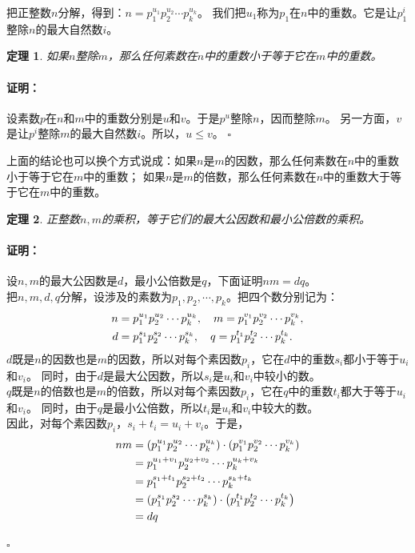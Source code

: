 \documentclass[12pt,UTF8]{ctexbook}
\newtheorem{tm}{定理}[section]
\newenvironment{proof2}{\paragraph{\textbf{证明：}}}{\hfill$\square$}
\begin{document}
把正整数$n$分解，得到：$n = p_1^{u_1} p_2^{u_2} \cdots p_k^{u_k}$。
我们把$u_1$称为$p_1$在$n$中的重数。它是让$p_1^i$整除$n$的最大自然数$i$。
\begin{tm}\label{tm:1-1-10}
    如果$n$整除$m$，那么任何素数在$n$中的重数小于等于它在$m$中的重数。
\end{tm}
\begin{proof2}
    设素数$p$在$n$和$m$中的重数分别是$u$和$v$。于是$p^u$整除$n$，因而整除$m$。
    另一方面，$v$是让$p^i$整除$m$的最大自然数$i$。所以，$u \leqslant v$。
\end{proof2}

上面的结论也可以换个方式说成：如果$n$是$m$的因数，那么任何素数在$n$中的重数小于等于它在$m$中的重数；
如果$n$是$m$的倍数，那么任何素数在$n$中的重数大于等于它在$m$中的重数。

\begin{tm}\label{tm:1-1-20}
    正整数$n,m$的乘积，等于它们的最大公因数和最小公倍数的乘积。
\end{tm}
\begin{proof2}
    设$n,m$的最大公因数是$d$，最小公倍数是$q$，下面证明$nm = dq$。\\
    把$n,m,d,q$分解，设涉及的素数为$p_1, p_2, \cdots , p_k$。把四个数分别记为：
    \begin{align}
        n &= p_1^{u_1}p_2^{u_2}\cdots p_k^{u_k}, \quad m = p_1^{v_1}p_2^{v_2}\cdots p_k^{v_k}, \notag \\
        d &= p_1^{s_1}p_2^{s_2}\cdots p_k^{s_k}, \quad q = p_1^{t_1}p_2^{t_2}\cdots p_k^{t_k}. \notag 
    \end{align}
    $d$既是$n$的因数也是$m$的因数，所以对每个素因数$p_i$，它在$d$中的重数$s_i$都小于等于$u_i$和$v_i$。
    同时，由于$d$是最大公因数，所以$s_i$是$u_i$和$v_i$中较小的数。\\
    $q$既是$n$的倍数也是$m$的倍数，所以对每个素因数$p_i$，它在$q$中的重数$t_i$都大于等于$u_i$和$v_i$。
    同时，由于$q$是最小公倍数，所以$t_i$是$u_i$和$v_i$中较大的数。\\
    因此，对每个素因数$p_i$，$s_i + t_i = u_i + v_i$。于是，
    \begin{align}
        nm &= \left(p_1^{u_1}p_2^{u_2}\cdots p_k^{u_k}\right) \cdot \left(p_1^{v_1}p_2^{v_2}\cdots p_k^{v_k}\right) \notag \\
        &= p_1^{u_1 + v_1}p_2^{u_2 + v_2}\cdots p_k^{u_k + v_k} \notag \\
        &= p_1^{s_1 + t_1}p_2^{s_2 + t_2}\cdots p_k^{s_k + t_k} \notag \\
        &= \left(p_1^{s_1}p_2^{s_2}\cdots p_k^{s_k}\right) \cdot \left(p_1^{t_1}p_2^{t_2}\cdots p_k^{t_k}\right) \notag \\
        &= dq \notag
    \end{align}    

\end{proof2}
\end{document}
